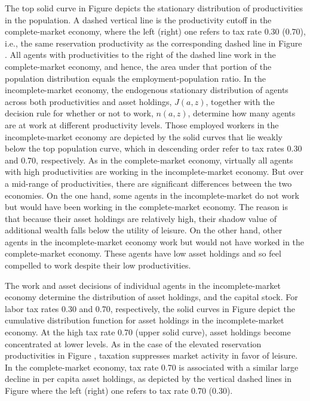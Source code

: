 The top solid curve in Figure  depicts the
stationary distribution of productivities in the population. A dashed
vertical line is the productivity cutoff in the complete-market
economy, where the left (right) one refers to tax rate 0.30 (0.70),
i.e., the same reservation productivity as the corresponding dashed
line in Figure . All agents with productivities
to the right of the dashed line work in the complete-market economy,
and hence, the area under that portion of the population
distribution equals the employment-population ratio.
In the incomplete-market economy, the endogenous stationary
distribution of agents across both productivities and asset holdings,
$J(a,z)$, together with the decision rule for whether or not to work,
$n(a,z)$, determine how many agents are at work at different productivity
levels. Those employed workers in the incomplete-market economy are
depicted by the solid curves that lie weakly below the top population
curve, which in descending order refer to tax rates
0.30 and 0.70, respectively. As in the complete-market economy, virtually
all agents with high productivities are working in the incomplete-market
economy. But over a mid-range of productivities, there
are significant differences between the two economies. On the one hand,
 some agents in the incomplete-market do not work but would have been working in the complete-market economy. The reason
is that because their asset holdings are relatively high,  their
shadow value of additional wealth falls below the utility of leisure.
On the other hand, other agents in the incomplete-market
economy  work but would not have worked in the
complete-market economy. These agents have low
asset holdings and so feel compelled to work despite their low
productivities.


The work and asset decisions of individual agents in the incomplete-market
economy determine the distribution of asset holdings, and the
capital stock. For labor tax rates 0.30 and 0.70, respectively, the
solid curves in Figure  depict the cumulative
distribution function for asset holdings in the incomplete-market
economy. At the high tax rate 0.70 (upper solid curve), asset holdings
become concentrated at lower levels. As in the case of the elevated
reservation productivities in
Figure , taxation suppresses market
activity in favor of leisure. In the complete-market economy, tax rate
0.70 is associated with a similar large decline in per capita
asset holdings, as depicted by the vertical dashed lines
in Figure  where the left (right) one refers to
tax rate 0.70 (0.30).


